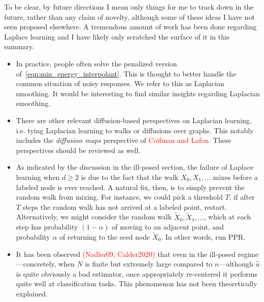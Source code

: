 \documentclass{article}
\newcommand{\1}{\mathbf{1}}
\newcommand{\wt}[1]{\widetilde{#1}}
\newcommand{\wh}[1]{\widehat{#1}}
\theoremstyle{definition}
\theoremstyle{remark}
\begin{document}
To be clear, by future directions I mean only things for me to track down in the future, rather than any claim of novelty, although some of these ideas I have not seen proposed elsewhere. A tremendous amount of work has been done regarding Laplace learning and I have likely only scratched the surface of it in this summary.
\begin{itemize}
	\item In practice, people often solve the penalized version of~\eqref{eqn:min_energy_interpolant}. This is thought to better handle the common situation of noisy responses. We refer to this as Laplacian smoothing. It would be interesting to find similar insights regarding Laplacian smoothing.
	\item There are other relevant diffusion-based perspectives on Laplacian learning, i.e. tying Laplacian learning to walks or diffusions over graphs. This notably includes the \emph{diffusion maps} perspective of \textcolor{red}{Coifman and Lafon}. These perspectives should be reviewed as well. 
	\item As indicated by the discussion in the ill-posed section, the failure of Laplace learning when $d \geq 2$ is due to the fact that the walk $X_0,X_1,\ldots$ mixes before a labeled node is ever reached. A natural fix, then, is to simply prevent the random walk from mixing. For instance, we could pick a threshold $T$; if after $T$ steps the random walk has not arrived at a labeled point, restart. Alternatively, we might consider the random walk $\wt{X}_0,\wt{X}_1,\ldots$, which at each step has probability $(1 - \alpha)$ of moving to an adjacent point, and probability $\alpha$ of returning to the seed node $\wt{X}_0$. In other words, run PPR.
	\item It has been observed \textcolor{red}{(Nadler09, Calder2020)} that even in the ill-posed regime---concretely, when $N$ is finite but extremely large compared to $n$---although $\wh{u}$ is quite obviously a bad estimator, once appropriately re-centered it performs quite well at classification tasks. This phenomenon has not been theoretically explained. 
\end{itemize}
\end{document}
